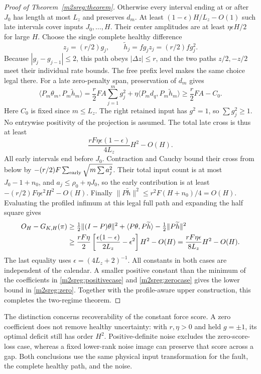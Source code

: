 \begin{proof}[Proof of Theorem~\ref{m2sreg:theorem}]
Otherwise every interval ending at or after $J_0$ has length
at most $L_z$ and preserves $d_m$.
At least $(1-\epsilon)H/L_z-O(1)$ such late intervals cover
inputs $J_0,\ldots,H$. Their center amplitudes are at least
$\eta\epsilon H/2$ for large $H$.
Choose the single complete healthy difference
\[
z_j=(r/2)g_j,\qquad \widetilde h_j=fg_jz_j=(r/2)fg_j^2 .
\]
Because $|g_j-g_{j-1}|\le2$, this path obeys $|\Delta z|\le r$,
and the two paths $z/2,-z/2$ meet their individual rate bounds.
The free prefix level makes the same choice legal there.
For a late zero-penalty span, preservation of $d_m$ gives
\[
\langle P_m\theta_m,P_m\widetilde h_m\rangle
=\frac r2FA\sum_{j=1}^m g_j^2+
 \eta\langle P_md_q,P_m\widetilde h_m\rangle
\ge \frac r2FA-C_0 .
\]
Here $C_0$ is fixed since $m\le L_z$.
The right retained input has $g^2=1$, so $\sum g_j^2\ge1$.
No entrywise positivity of the projection is assumed.
The total late cross is thus at least
\[
\frac{rF\eta\epsilon(1-\epsilon)}{4L_z}H^2-O(H).
\]
All early intervals end before $J_0$.
Contraction and Cauchy bound their cross from below by
$-(r/2)F\sum_{\rm early}\sqrt{m\sum a_j^2}$.
Their total input count is at most $J_0-1+n_0$, and
$a_j\le\rho_0+\eta J_0$, so the early contribution is at least
$-(r/2)F\eta\epsilon^2H^2-O(H)$.
Finally $\|P\widetilde h\|^2\le r^2F(H+n_0)/4=O(H)$.
Evaluating the profiled infimum at this legal full path and expanding
the half square gives
\begin{align}
O_H-G_{K,H}(\pi)
&\ge \tfrac12\|(I-P)\theta\|^2+
 \langle P\theta,P\widetilde h\rangle-
 \tfrac12\|P\widetilde h\|^2 \notag\\
&\ge \frac{rF\eta}{2}
 \left[\frac{\epsilon(1-\epsilon)}{2L_z}-\epsilon^2\right]H^2-O(H)
 =\frac{rF\eta\epsilon}{8L_z}H^2-O(H).
\label{m2sreg:zerocase}
\end{align}
The last equality uses $\epsilon=(4L_z+2)^{-1}$.
All constants in both cases are independent of the calendar.
A smaller positive constant than the minimum of the coefficients
in \eqref{m2sreg:positivecase} and \eqref{m2sreg:zerocase}
gives the lower bound in \eqref{m2sreg:zero}.
Together with the profile-aware upper construction, this completes
the two-regime theorem.
\end{proof}

The distinction concerns recoverability of the constant force score.
A zero coefficient does not remove healthy uncertainty: with
$r,\eta>0$ and held $g=\pm1$, its optimal deficit still has order $H^2$.
Positive-definite noise excludes the zero-score-loss case, whereas
a fixed lower-rank noise image can preserve that score across a gap.
Both conclusions use the same physical input transformation for the
fault, the complete healthy path, and the noise.

